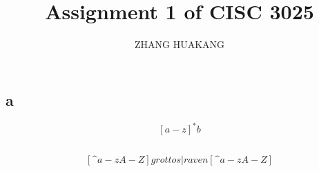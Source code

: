 \documentclass{article}
\title{Assignment 1 of CISC 3025}
\author{ZHANG HUAKANG}
\begin{document}
    \maketitle
    \section{}
    \subsection*{a}
    $$[a-z]^*b$$
    \subsection*{}
    $$[\^a-zA-Z]grottos|raven[\^a-zA-Z]$$
\end{document}
